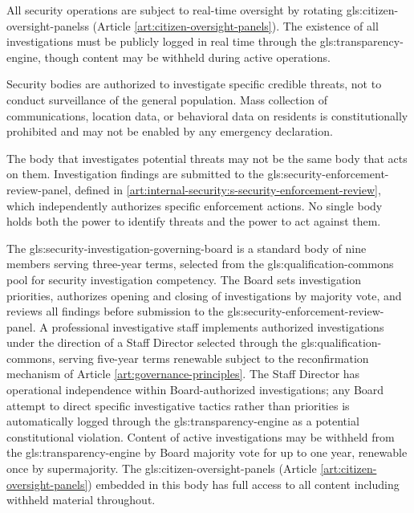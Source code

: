 


All security operations are subject to real-time oversight by rotating \gls{gls:citizen-oversight-panels}s (Article \ref{art:citizen-oversight-panels}). The existence of all investigations must be publicly logged in real time through the \gls{gls:transparency-engine}, though content may be withheld during active operations.

Security bodies are authorized to investigate specific credible threats, not to conduct surveillance of the general population. Mass collection of communications, location data, or behavioral data on residents is constitutionally prohibited and may not be enabled by any emergency declaration.

The body that investigates potential threats may not be the same body that acts on them. Investigation findings are submitted to the \gls{gls:security-enforcement-review-panel}, defined in \ref{art:internal-security:s-security-enforcement-review}, which independently authorizes specific enforcement actions. No single body holds both the power to identify threats and the power to act against them.

The \gls{gls:security-investigation-governing-board} is a standard body of nine members serving three-year terms, selected from the \gls{gls:qualification-commons} pool for security investigation competency. The Board sets investigation priorities, authorizes opening and closing of investigations by majority vote, and reviews all findings before submission to the \gls{gls:security-enforcement-review-panel}. A professional investigative staff implements authorized investigations under the direction of a Staff Director selected through the \gls{gls:qualification-commons}, serving five-year terms renewable subject to the reconfirmation mechanism of Article \ref{art:governance-principles}. The Staff Director has operational independence within Board-authorized investigations; any Board attempt to direct specific investigative tactics rather than priorities is automatically logged through the \gls{gls:transparency-engine} as a potential constitutional violation. Content of active investigations may be withheld from the \gls{gls:transparency-engine} by Board majority vote for up to one year, renewable once by supermajority. The \gls{gls:citizen-oversight-panels} (Article \ref{art:citizen-oversight-panels}) embedded in this body has full access to all content including withheld material throughout.

